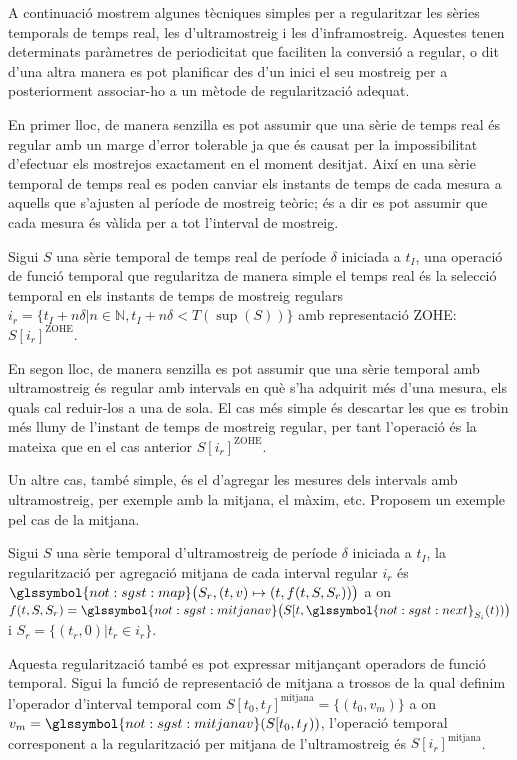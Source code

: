 A continuació mostrem algunes tècniques simples per a regularitzar les
sèries temporals de temps real, les d'ultramostreig i les
d'inframostreig. Aquestes tenen determinats paràmetres de periodicitat
que faciliten la conversió a regular, o dit d'una altra manera es pot
planificar des d'un inici el seu mostreig per a posteriorment
associar-ho a un mètode de regularització adequat.


En primer lloc, de manera senzilla es pot assumir que una sèrie de
temps real és regular amb un marge d'error tolerable ja que és causat
per la impossibilitat d'efectuar els mostrejos exactament en el moment
desitjat. Així en una sèrie temporal de temps real es poden canviar
els instants de temps de cada mesura a aquells que s'ajusten al
període de mostreig teòric; és a dir es pot assumir que cada mesura és
vàlida per a tot l'interval de mostreig. 

Sigui $S$ una sèrie temporal de temps real de període $\delta$
iniciada a $t_I$, una operació de funció temporal que regularitza de
manera simple el temps real és la selecció temporal en els instants de
temps de mostreig regulars $i_r=\{t_I+n\delta | n\in\mathbb{N},
t_I+n\delta < T(\sup(S))\}$ amb representació ZOHE:
$S[i_r]^\text{ZOHE}$.


En segon lloc, de manera senzilla es pot assumir que una sèrie
temporal amb ultramostreig és regular amb intervals en què s'ha
adquirit més d'una mesura, els quals cal reduir-los a una de sola. El
cas més simple és descartar les que es trobin més lluny de l'instant
de temps de mostreig regular, per tant l'operació és la mateixa que en
el cas anterior $S[i_r]^\text{ZOHE}$.

Un altre cas, també simple, és el d'agregar les mesures dels intervals
amb ultramostreig, per exemple amb la mitjana, el màxim, etc.
Proposem un exemple pel cas de la mitjana.

Sigui $S$ una sèrie temporal d'ultramostreig de període $\delta$
iniciada a $t_I$, la regularització per agregació mitjana de cada
interval regular $i_r$ és $\glssymbol{not:sgst:map}\big(S_r, (t,v)
\mapsto (t,f(t,S,S_r))\big)$ a on
$f(t,S,S_r)=\glssymbol{not:sgst:mitjanav}\big(S[t,
\glssymbol{not:sgst:next}_{S_i}(t))\big)$ i $S_r=\{ (t_r,0) | t_r\in
i_r \}$.

Aquesta regularització també es pot expressar mitjançant operadors de
funció temporal. Sigui la funció de representació de mitjana a trossos
de la qual definim l'operador d'interval temporal com
$S[t_0,t_f]^\text{mitjana}=\{(t_0,v_m)\}$ a on
$v_m=\glssymbol{not:sgst:mitjanav}(S[t_0,t_f))$, l'operació temporal
corresponent a la regularització per mitjana de l'ultramostreig és
$S[i_r]^\text{mitjana}$.


